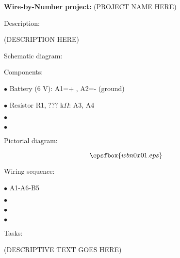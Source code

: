 

\centerline{{\bf Wire-by-Number project:} (PROJECT NAME HERE)} \bigskip 

\noindent Description:

(DESCRIPTION HERE)

\vskip 10pt

\goodbreak

\noindent Schematic diagram: 


\vskip 10pt

\goodbreak

\noindent Components:

\medskip
\item{$\bullet$} Battery (6 V): A1=+ , A2=- (ground)
\item{$\bullet$} Resistor R1, ??? k$\Omega$: A3, A4
\item{$\bullet$}
\item{$\bullet$}
\medskip


\vskip 10pt

\goodbreak

\noindent Pictorial diagram:

$$\epsfbox{wbn0x01.eps}$$

\vskip 10pt

\goodbreak

\noindent Wiring sequence:

\medskip
\item{$\bullet$} A1-A6-B5
\item{$\bullet$} 
\item{$\bullet$} 
\item{$\bullet$} 
\medskip

\vskip 10pt

\goodbreak

\noindent Tasks:

(DESCRIPTIVE TEXT GOES HERE)

